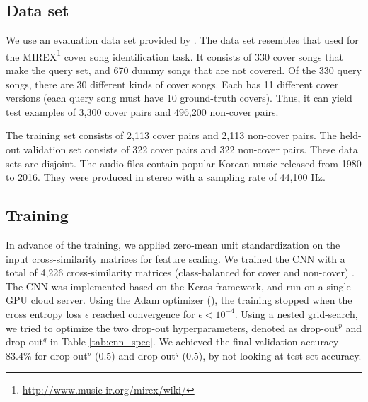 \documentclass{article}
\begin{document}
\subsection{Data set}
\label{subsec:dataset}
We use an evaluation data set provided by \citet{heocover}. The data set resembles that used for the MIREX\footnote{\url{http://www.music-ir.org/mirex/wiki/}} cover song identification task. It consists of 330 cover songs that make the query set, and 670 dummy songs that are not covered. Of the 330 query songs, there are 30 different kinds of cover songs. Each has 11 different cover versions (each query song must have 10 ground-truth covers). Thus, it can yield test examples of 3,300 cover pairs and 496,200 non-cover pairs.
 
The training set consists of 2,113 cover pairs and 2,113 non-cover pairs. The held-out validation set consists of 322 cover pairs and 322 non-cover pairs. These data sets are disjoint. The audio files contain popular Korean music released from 1980 to 2016. They were produced in stereo with a sampling rate of 44,100 Hz.

\subsection{Training}
\label{subsec:training}
In advance of the training, we applied zero-mean unit standardization on the input cross-similarity matrices for feature scaling. We trained the CNN with a total of 4,226 cross-similarity matrices (class-balanced for cover and non-cover) . The CNN was implemented based on the Keras framework, and run on a single GPU cloud server. Using the Adam optimizer (\citet{kingma2014adam}), the training stopped when the cross entropy loss $\epsilon$ reached convergence for $\epsilon < 10^{-4}$. Using a nested grid-search, we tried to optimize the two drop-out hyperparameters, denoted as drop-out$^p$ and drop-out$^q$ in Table \ref{tab:cnn_spec}. We achieved the final validation accuracy 83.4\% for drop-out$^p$ (0.5) and drop-out$^q$ (0.5), by not looking at test set accuracy.    
\end{document}
